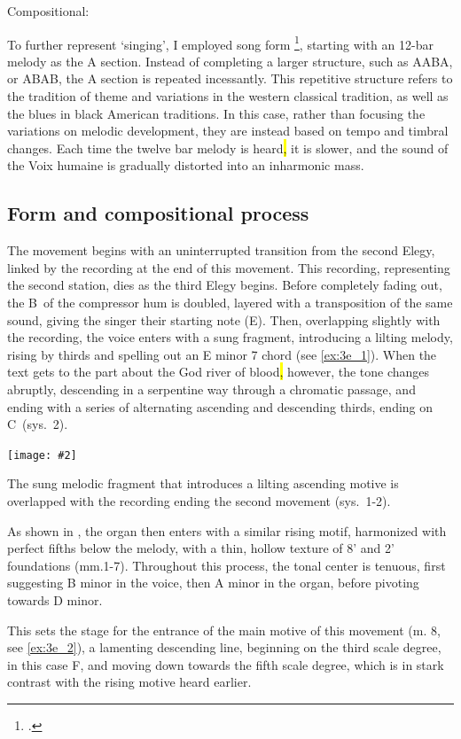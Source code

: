 \documentclass[12pt,twoside,maitrise]{dms_ks}
\newcommand{\customincludeexamples}[4][]{%
    \begin{example}[H]
        \centering
        \texttt{[image: \#2]}
        \caption{#4}
	\label{#3} 
    \end{example}
}
\theoremstyle{definition}
\begin{document}
{Compositional:

To further represent `singing', I employed song form \footcite{owens_forms_2003}, starting with an 12-bar melody as the A section.
Instead of completing a larger structure, such as AABA, or ABAB, the A section is repeated incessantly.
This repetitive structure refers to the tradition of theme and variations in the western classical tradition, as well as the blues in black American traditions.  
In this case, rather than focusing the variations on melodic development, they are instead based on tempo and timbral changes. 
Each time the twelve bar melody is heard\hl{,} it is slower, and the sound of the Voix humaine is gradually distorted into an inharmonic mass.

\subsection{Form and compositional process}

The movement begins with an uninterrupted transition from the second Elegy, linked by the recording at the end of this movement. 
This recording, representing the second station, dies as the third Elegy begins. 
Before completely fading out, the B\na\ of the compressor hum is doubled, layered with a transposition of the same sound, giving the singer their starting note (E\na). 
Then, overlapping slightly with the recording, the voice enters with a sung fragment, introducing a lilting melody, rising by thirds and spelling out an E minor 7 chord (see \cref{ex:3e_1}). 
When the text gets to the part about the God river of blood\hl{,} however, the tone changes abruptly, descending in a serpentine way through a chromatic passage, and ending with a series of alternating ascending and descending thirds, ending on C\na\ (sys.~2).

\customincludeexamples[width=\textwidth]{3e_1}{ex:3e_1}{The sung melodic fragment that introduces a lilting ascending motive is overlapped with the recording ending the second movement (sys.~1-2).}

As shown in , the organ then enters with a similar rising motif, harmonized with perfect fifths below the melody, with a thin, hollow texture of 8' and 2' foundations (mm.1-7).
Throughout this process, the tonal center is tenuous, first suggesting B minor in the voice, then A minor in the organ, before pivoting towards D minor.  

This sets the stage for the entrance of the main motive of this movement (m. 8, see \cref{ex:3e_2}), a lamenting descending line, beginning on the third scale degree, in this case F, and moving down towards the fifth scale degree, which is in stark contrast with the rising motive heard earlier.  

}
\end{document}
